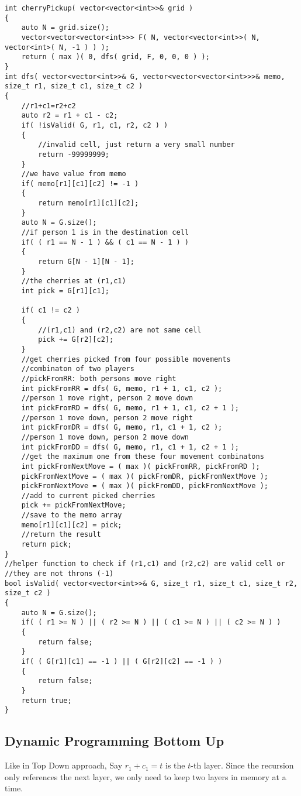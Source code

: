 \setcounter{lstlisting}{0}
\begin{lstlisting}[style=customc, caption={Dynamic Programming Top Down}]
int cherryPickup( vector<vector<int>>& grid )
{
    auto N = grid.size();
    vector<vector<vector<int>>> F( N, vector<vector<int>>( N, vector<int>( N, -1 ) ) );
    return ( max )( 0, dfs( grid, F, 0, 0, 0 ) );
}
int dfs( vector<vector<int>>& G, vector<vector<vector<int>>>& memo, size_t r1, size_t c1, size_t c2 )
{
    //r1+c1=r2+c2
    auto r2 = r1 + c1 - c2;
    if( !isValid( G, r1, c1, r2, c2 ) )
    {
        //invalid cell, just return a very small number
        return -99999999;
    }
    //we have value from memo
    if( memo[r1][c1][c2] != -1 )
    {
        return memo[r1][c1][c2];
    }
    auto N = G.size();
    //if person 1 is in the destination cell
    if( ( r1 == N - 1 ) && ( c1 == N - 1 ) )
    {
        return G[N - 1][N - 1];
    }
    //the cherries at (r1,c1)
    int pick = G[r1][c1];

    if( c1 != c2 )
    {
        //(r1,c1) and (r2,c2) are not same cell
        pick += G[r2][c2];
    }
    //get cherries picked from four possible movements
    //combinaton of two players
    //pickFromRR: both persons move right
    int pickFromRR = dfs( G, memo, r1 + 1, c1, c2 );
    //person 1 move right, person 2 move down
    int pickFromRD = dfs( G, memo, r1 + 1, c1, c2 + 1 );
    //person 1 move down, person 2 move right
    int pickFromDR = dfs( G, memo, r1, c1 + 1, c2 );
    //person 1 move down, person 2 move down
    int pickFromDD = dfs( G, memo, r1, c1 + 1, c2 + 1 );
    //get the maximum one from these four movement combinatons
    int pickFromNextMove = ( max )( pickFromRR, pickFromRD );
    pickFromNextMove = ( max )( pickFromDR, pickFromNextMove );
    pickFromNextMove = ( max )( pickFromDD, pickFromNextMove );
    //add to current picked cherries
    pick += pickFromNextMove;
    //save to the memo array
    memo[r1][c1][c2] = pick;
    //return the result
    return pick;
}
//helper function to check if (r1,c1) and (r2,c2) are valid cell or
//they are not throns (-1)
bool isValid( vector<vector<int>>& G, size_t r1, size_t c1, size_t r2, size_t c2 )
{
    auto N = G.size();
    if( ( r1 >= N ) || ( r2 >= N ) || ( c1 >= N ) || ( c2 >= N ) )
    {
        return false;
    }
    if( ( G[r1][c1] == -1 ) || ( G[r2][c2] == -1 ) )
    {
        return false;
    }
    return true;
}
\end{lstlisting}

\subsection{Dynamic Programming Bottom Up}
Like in Top Down approach, Say $r_1 + c_1 = t$ is the $t$-th layer. Since the recursion only references the next layer, we only need to keep two layers in memory at a time.

